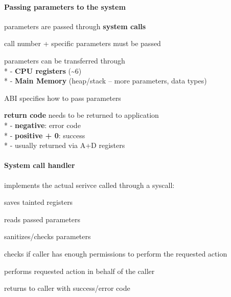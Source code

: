 \paragraph{Passing parameters to the system}
\begin{items}
  \item parameters are passed through \textbf{system calls}
  \item call number + specific parameters must be passed
  \item parameters can be transferred through \\*
    - \textbf{CPU registers} (\textasciitilde 6) \\*
    - \textbf{Main Memory} (heap/stack -- more parameters, data types)
  \item ABI specifies how to pass parameters
  \item \textbf{return code} needs to be returned to application \\*
    - \textbf{negative}: error code \\*
    - \textbf{positive + 0}: success \\*
    - usually returned via A+D registers
\end{items}

\paragraph{System call handler}
\begin{items}
  \item implements the actual serivce called through a syscall:
  \begin{enumeration}
    \item saves tainted registers
    \item reads passed parameters
    \item sanitizes/checks parameters
    \item checks if caller has enough permissions to perform the requested action
    \item performs requested action in behalf of the caller
    \item returns to caller with success/error code
  \end{enumeration}
\end{items}

